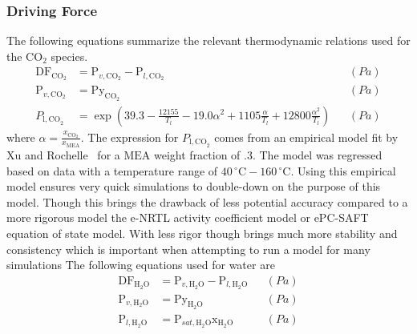 \documentclass[12pt, letterpaper]{article}
\begin{document}
            \subsubsection{Driving Force}
                The following equations summarize the relevant thermodynamic relations used for the $\mathrm{CO}_2$ species.
                \begin{align}
                    \mathrm{DF}_{\mathrm{CO}_2} &= \mathrm{P}_{v, \mathrm{CO}_2} - \mathrm{P}_{l, \mathrm{CO}_2}  &&\left(\unit{Pa} \right)\\
                    \mathrm{P}_{v, \mathrm{CO}_2} &= \mathrm{P} \mathrm{y}_{\mathrm{CO}_2} && \left(\unit{Pa} \right)\\
                    P_{\mathrm{l,CO}_2} &= \exp\left(39.3 - \frac{12155}{T_{l}} - 19.0 \alpha ^2 + 1105  \frac{\alpha}{T_{l}} + 12800 \frac{\alpha ^2}{T_{l}} \right) &&\left(\unit{Pa} \right)
                \end{align}
                where $\alpha = \frac{x_{\mathrm{CO}_2}}{x_{\mathrm{MEA}}}$.
                The expression for $P_{\mathrm{l,CO}_2}$ comes from an empirical model fit by Xu and Rochelle~\cite{Xu2011TotalAmines} for a $\mathrm{MEA}$ weight fraction of .3.
                The model was regressed based on data with a temperature range of $40\,^\circ\mathrm{C} - 160\,^\circ\mathrm{C}$.
                Using this empirical model ensures very quick simulations to double-down on the purpose of this model.
                Though this brings the drawback of less potential accuracy compared to a more rigorous model the e-NRTL activity coefficient model or ePC-SAFT equation of state model.
                With less rigor though brings much more stability and consistency which is important when attempting to run a model for many simulations
                The following equations used for water are
                \begin{align}
                    \mathrm{DF}_{\mathrm{H_{2}O}} &= \mathrm{P}_{v, \mathrm{H_{2}O}} - \mathrm{P}_{l, \mathrm{H_{2}O}} && \left(\unit{Pa} \right)\\
                    \mathrm{P}_{v, \mathrm{H_{2}O}} &= \mathrm{P} \mathrm{y}_{\mathrm{H_{2}O}} && \left(\unit{Pa} \right)\\
                    \mathrm{P}_{l, \mathrm{H_{2}O}} &= \mathrm{P}_{sat, \mathrm{H_{2}O}} \mathrm{x}_{\mathrm{H_{2}O}} && \left(\unit{Pa} \right)
                \end{align}
            
\end{document}
